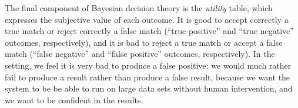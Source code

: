 The final component of Bayesian decision theory is the \emph{utility}
table, which expresses the subjective value of each outcome.  It is
good to accept correctly a true match or reject correctly a false
match (``true positive'' and ``true negative'' outcomes,
respectively), and it is bad to reject a true match or accept a false
match (``false negative'' and ``false positive'' outcomes,
respectively).  In the \an setting, we feel it is very bad to produce
a false positive: we would much rather fail to produce a result rather
than produce a false result, because we want the system to be be able
to run on large data sets without human intervention, and we want to
be confident in the results.
%

